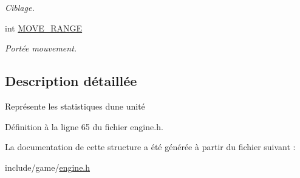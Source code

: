 \begin{DoxyCompactItemize}
\begin{DoxyCompactList}\small\item\em Ciblage. \end{DoxyCompactList}\item 
\hypertarget{structunitStat_a4fb8a90b096d073d947c861a5536c2b9}{}int \hyperlink{structunitStat_a4fb8a90b096d073d947c861a5536c2b9}{M\+O\+V\+E\+\_\+\+R\+A\+N\+G\+E}\label{structunitStat_a4fb8a90b096d073d947c861a5536c2b9}

\begin{DoxyCompactList}\small\item\em Portée mouvement. \end{DoxyCompactList}\end{DoxyCompactItemize}


\subsection{Description détaillée}
Représente les statistiques d\textquotesingle{}une unité 

Définition à la ligne 65 du fichier engine.\+h.



La documentation de cette structure a été générée à partir du fichier suivant \+:\begin{DoxyCompactItemize}
\item 
include/game/\hyperlink{engine_8h}{engine.\+h}\end{DoxyCompactItemize}
